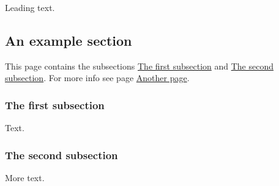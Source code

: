 Leading text. \hypertarget{page1_sec}{}\subsection{An example section}\label{page1_sec}
This page contains the subsections \hyperlink{page1_subsection1}{The first subsection} and \hyperlink{page1_subsection2}{The second subsection}. For more info see page \hyperlink{page2}{Another page}. \hypertarget{page1_subsection1}{}\subsubsection{The first subsection}\label{page1_subsection1}
Text. \hypertarget{page1_subsection2}{}\subsubsection{The second subsection}\label{page1_subsection2}
More text. 
